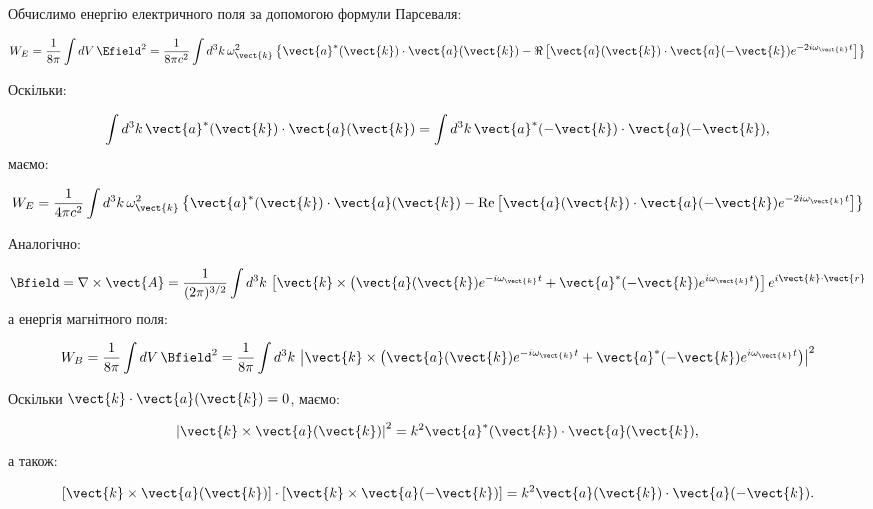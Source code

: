 Обчислимо енергію електричного поля за допомогою формули Парсеваля:

\begin{equation}
W_E = \frac{1}{8\pi} \int dV \, \Efield^2 = \frac{1}{8\pi c^2} \int d^3k \, \omega_{\vect{k}}^2 \left\{ \vect{a}^*(\vect{k}) \cdot \vect{a}(\vect{k}) -
\Re \left[ \vect{a}(\vect{k}) \cdot \vect{a}(-\vect{k}) e^{-2i\omega_{\vect{k}} t} \right] \right\}
\label{eq:W_E}
\end{equation}

Оскільки:

\begin{equation*}
\int d^3k \, \vect{a}^*(\vect{k}) \cdot \vect{a}(\vect{k}) = \int d^3k \, \vect{a}^*(-\vect{k}) \cdot \vect{a}(-\vect{k}),
\end{equation*}
маємо:

\begin{equation}
W_E = \frac{1}{4\pi c^2} \int d^3k \, \omega_{\vect{k}}^2 \left\{ \vect{a}^*(\vect{k}) \cdot \vect{a}(\vect{k}) - \text{Re} \left[ \vect{a}(\vect{k})
\cdot \vect{a}(-\vect{k}) e^{-2i\omega_{\vect{k}} t} \right] \right\}
\label{eq:W_E_final}
\end{equation}

Аналогічно:

\begin{equation}
\Bfield = \nabla \times \vect{A} = \frac{1}{(2\pi)^{3/2}} \int d^3k \, \left[ \vect{k} \times \left( \vect{a}(\vect{k}) e^{-i\omega_{\vect{k}} t} +
\vect{a}^*(-\vect{k}) e^{i\omega_{\vect{k}} t} \right) \right] e^{i\vect{k} \cdot \vect{r}}
\label{eq:B_field_fourier}
\end{equation}
а енергія магнітного поля:

\begin{equation}
W_B = \frac{1}{8\pi} \int dV \, \Bfield^2 = \frac{1}{8\pi} \int d^3k \, \left| \vect{k} \times \left( \vect{a}(\vect{k}) e^{-i\omega_{\vect{k}} t} +
\vect{a}^*(-\vect{k}) e^{i\omega_{\vect{k}} t} \right) \right|^2
\label{eq:W_B}
\end{equation}

Оскільки \(\vect{k} \cdot \vect{a}(\vect{k}) = 0\), маємо:

\begin{equation*}
\left| \vect{k} \times \vect{a}(\vect{k}) \right|^2 = k^2 \vect{a}^*(\vect{k}) \cdot \vect{a}(\vect{k}),
\end{equation*}
а також:

\begin{equation*}
\left[ \vect{k} \times \vect{a}(\vect{k}) \right] \cdot \left[ \vect{k} \times \vect{a}(-\vect{k}) \right] = k^2 \vect{a}(\vect{k}) \cdot
\vect{a}(-\vect{k}).
\end{equation*}

